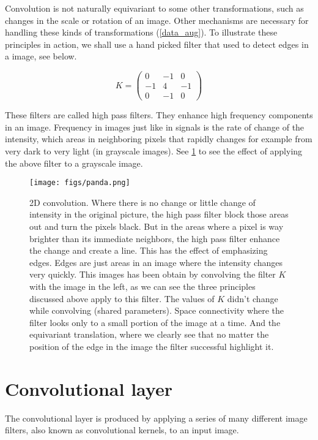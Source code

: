 Convolution is not naturally equivariant to some other transformations, such as changes in the scale or rotation of an image. Other
mechanisms are necessary for handling these kinds of transformations (\cref{data_aug}). To illustrate these principles in action, we shall use a hand picked filter that used to detect edges in a image, see below.

$$
K = \begin{pmatrix}
0  & -1  &  0 \\
-1 &  4  & -1 \\
0  & -1  &  0
\end{pmatrix}
$$

These filters are called high pass filters. They enhance high frequency components in an image. Frequency in images just like in signals is the rate
of change of the intensity, which areas in neighboring pixels that rapidly changes for example from very dark to very light (in grayscale images).
See \cref{fig:filter} to see the effect of applying the above filter to a grayscale image.

\begin{figure}[H]
  \centering
  \texttt{[image: figs/panda.png]}
  \caption[2D convolution]{2D convolution. Where there is no change or little change of intensity in the original picture, the high pass filter
  block those areas out and turn the pixels black. But in the areas where a pixel is way brighter than its immediate neighbors, the high pass filter
  enhance the change and create a line. This has the effect of emphasizing edges. Edges are just areas in an image where the intensity changes very
  quickly. This images has been obtain by convolving the filter $K$ with the image in the left, as we can see the three principles discussed above
  apply to this filter. The values of $K$ didn't change while convolving (shared parameters). Space connectivity where
  the filter looks only to a small portion of the image at a time. And the equivariant translation, where we clearly see that no matter the position
  of the edge in the image the filter successful highlight it.}\label{fig:filter}
\end{figure}

\section{Convolutional layer}

The convolutional layer is produced by applying a series of many different image filters, also known as convolutional kernels, to an input image.


